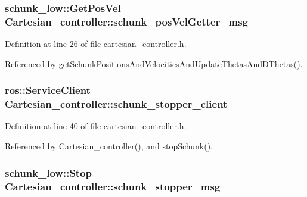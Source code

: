 \hypertarget{classCartesian__controller_ae368dcf84dae528612c617cc92fbb69f}{
\subsubsection[{schunk\-\_\-pos\-Vel\-Getter\-\_\-msg}]{\setlength{\rightskip}{0pt plus 5cm}schunk\-\_\-low\-::\-Get\-Pos\-Vel Cartesian\-\_\-controller\-::schunk\-\_\-pos\-Vel\-Getter\-\_\-msg\hspace{0.3cm}{\ttfamily [protected]}}}\label{classCartesian__controller_ae368dcf84dae528612c617cc92fbb69f}


Definition at line 26 of file cartesian\-\_\-controller.\-h.



Referenced by get\-Schunk\-Positions\-And\-Velocities\-And\-Update\-Thetas\-And\-D\-Thetas().

\hypertarget{classCartesian__controller_a4ea7350e0f797c49bc51d3433a761aff}{
\subsubsection[{schunk\-\_\-stopper\-\_\-client}]{\setlength{\rightskip}{0pt plus 5cm}ros\-::\-Service\-Client Cartesian\-\_\-controller\-::schunk\-\_\-stopper\-\_\-client\hspace{0.3cm}{\ttfamily [protected]}}}\label{classCartesian__controller_a4ea7350e0f797c49bc51d3433a761aff}


Definition at line 40 of file cartesian\-\_\-controller.\-h.



Referenced by Cartesian\-\_\-controller(), and stop\-Schunk().

\hypertarget{classCartesian__controller_a29581ed2f2d8bb97c55e16868bbcc8bd}{
\subsubsection[{schunk\-\_\-stopper\-\_\-msg}]{\setlength{\rightskip}{0pt plus 5cm}schunk\-\_\-low\-::\-Stop Cartesian\-\_\-controller\-::schunk\-\_\-stopper\-\_\-msg\hspace{0.3cm}{\ttfamily [protected]}}}\label{classCartesian__controller_a29581ed2f2d8bb97c55e16868bbcc8bd}


